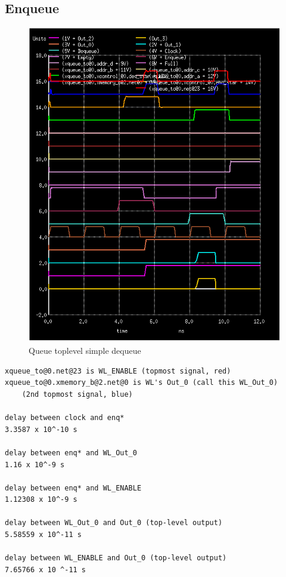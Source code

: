 \documentclass[12pt]{report}
\begin{document}
\subsection*{Enqueue}
\begin{figure}[H]
  \centering
    \includegraphics[width=1.0\textwidth]{queue_toplevel_test_simple_deq.PNG}
  \caption{Queue toplevel simple dequeue}
\end{figure}

\begin{verbatim}
xqueue_to@0.net@23 is WL_ENABLE (topmost signal, red)
xqueue_to@0.xmemory_b@2.net@0 is WL's Out_0 (call this WL_Out_0) 
    (2nd topmost signal, blue)

delay between clock and enq*
3.3587 x 10^-10 s

delay between enq* and WL_Out_0
1.16 x 10^-9 s

delay between enq* and WL_ENABLE
1.12308 x 10^-9 s

delay between WL_Out_0 and Out_0 (top-level output)
5.58559 x 10^-11 s

delay between WL_ENABLE and Out_0 (top-level output)
7.65766 x 10 ^-11 s
\end{verbatim}
\end{document}
